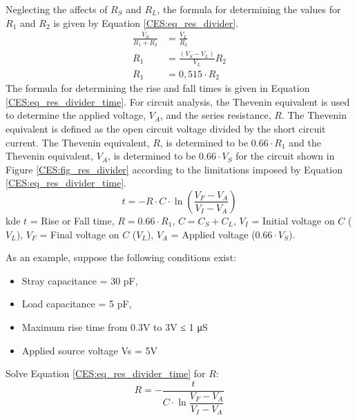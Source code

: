 {        Neglecting the affects of $R_S$ and $R_L$, the formula for determining the values for $R_1$
        and $R_2$ is given by Equation \ref{CES:eq_res_divider}.
        \begin{align}\label{CES:eq_res_divider}
          \frac{V_S}{R_1+R_2} &= \frac{V_L}{R_2}           \nonumber \\
                          R_1 &= \frac{(V_S-V_L)}{V_L}R_2  \nonumber \\
                          R_1 &= 0,515\cdot R_2
        \end{align}      
        The formula for determining the rise and fall times is given in Equation
        \ref{CES:eq_res_divider_time}. For circuit analysis, the Thevenin equivalent is used to
        determine the applied voltage, $V_A$, and the series resistance, $R$.
        The Thevenin equivalent is defined as the open circuit voltage divided by the short circuit
        current. The Thevenin equivalent, $R$, is determined to be $0.66\cdot R_1$ and the Thevenin
        equivalent, $V_A$, is determined to be $0.66\cdot V_S$ for the circuit shown in  Figure
        \ref{CES:fig_res_divider} according to the limitations imposed by Equation
        \ref{CES:eq_res_divider_time}.
        \begin{equation}\label{CES:eq_res_divider_time}
          t = - R\cdot C \cdot \ln\left(\frac{V_F-V_A}{V_I-V_A}\right)
        \end{equation}  
        kde $t$ = Rise or Fall time, $R = 0.66\cdot R_1$, $C = C_S+C_L$, $V_I$ = Initial voltage on
        $C$ ($V_L$), $V_F$ = Final voltage on $C$ ($V_L$), $V_A$ = Applied voltage ($0.66\cdot V_S$). 
        \begin{example} As an example, suppose the following conditions exist:
          \begin{itemize}\addtolength{\itemsep}{-0.5\baselineskip}
            \item Stray capacitance = 30 pF,
            \item Load capacitance = 5 pF,
            \item Maximum rise time from 0.3V to 3V ≤ 1 μS
            \item Applied source voltage Vs = 5V
          \end{itemize}
          Solve Equation \ref{CES:eq_res_divider_time} for $R$:  
          \begin{equation*}
            R = - \dfrac{t}{C\cdot\ln\dfrac{V_F-V_A}{V_I-V_A}}
          \end{equation*}   

\end{example}}
